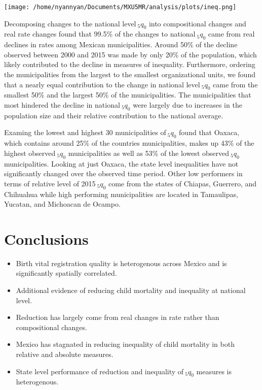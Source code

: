 \documentclass[a0,portrait]{a0poster}
\begin{document}
\begin{multicols}{2}
%
\begin{center}\vspace{1cm}
\texttt{[image: /home/nyannyan/Documents/MXU5MR/analysis/plots/ineq.png]}
\end{center}\vspace{1cm}
%

Decomposing changes to the national level$~_{5}q_{0}$ into compositional changes and real rate changes found that 99.5\% of the changes to national$~_{5}q_{0}$ came from real declines in rates among Mexican municipalities. Around 50\% of the decline observed between 2000 and 2015 was made by only 20\% of the population, which likely contributed to the decline in measures of inequality. Furthermore, ordering the municipalities from the largest to the smallest organizational units, we found that a nearly equal contribution to the change in national level$~_{5}q_{0}$ came from the smallest 50\% and the largest 50\% of the municipalities. The municipalities that most hindered the decline in national$~_{5}q_{0}$ were largely due to increases in the population size and their relative contribution to the national average.

Examing the lowest and highest 30 municipalities of$~_{5}q_{0}$ found that Oaxaca, which contains around 25\% of the countries municipalities, makes up 43\% of the highest observed$~_{5}q_{0}$ municipalities as well as 53\% of the lowest observed$~_{5}q_{0}$ municipalities. Looking at just Oaxaca, the state level inequalities have not significantly changed over the observed time period. Other low performers in terms of relative level of 2015$~_{5}q_{0}$ come from the states of Chiapas, Guerrero, and Chihuahua while high performing municipalities are located in Tamaulipas, Yucatan, and Michoacan de Ocampo.

\color{black} %

\section*{Conclusions}

\begin{itemize}
\item Birth vital registration quality is heterogenous across Mexico and is significantly spatially correlated.
\item Additional evidence of reducing child mortality and inequality at national level.
\item Reduction has largely come from real changes in rate rather than compositional changes.
\item Mexico has stagnated in reducing inequality of child mortality in both relative and absolute measures.
\item State level performance of reduction and inequality of$~_{5}q_{0}$ measures is heterogenous.
\end{itemize}


\end{multicols}
\end{document}
